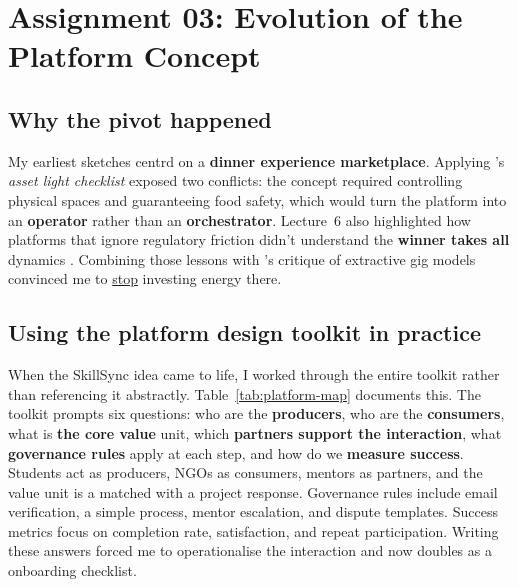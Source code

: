 \section*{Assignment 03: Evolution of the Platform Concept}

\subsection*{Why the pivot happened}
My earliest sketches centrd on a \textbf{dinner experience marketplace}. Applying \citet{Choudary2016}'s \textit{asset light checklist} exposed two conflicts: the concept required controlling physical spaces and guaranteeing food safety, which would turn the platform into an \textbf{operator} rather than an \textbf{orchestrator}. Lecture~6 also highlighted how platforms that ignore regulatory friction didn't understand the \textbf{winner takes all} dynamics \citep{Lecture06}. Combining those lessons with \citet{Srnicek2017}'s critique of extractive gig models convinced me to \underline{stop} investing energy there.

\subsection*{Using the platform design toolkit in practice}
When the SkillSync idea came to life, I worked through the entire \citet{Reillier2017} toolkit rather than referencing it abstractly. Table~\ref{tab:platform-map} documents this. The toolkit prompts six questions: who are the \textbf{producers}, who are the \textbf{consumers}, what is \textbf{the core value} unit, which \textbf{partners support the interaction}, what \textbf{governance rules} apply at each step, and how do we \textbf{measure success}. Students act as producers, NGOs as consumers, mentors as partners, and the value unit is a matched with a project response. Governance rules include email verification, a simple process, mentor escalation, and dispute templates. Success metrics focus on completion rate, satisfaction, and repeat participation. Writing these answers forced me to operationalise the interaction and now doubles as a onboarding checklist.

